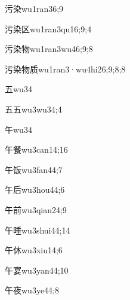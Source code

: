 \begin{verbete}{污染}{wu1ran3}{6;9}
\end{verbete}
\begin{verbete}{污染区}{wu1ran3qu1}{6;9;4}
\end{verbete}
\begin{verbete}{污染物}{wu1ran3wu4}{6;9;8}
\end{verbete}
\begin{verbete}{污染物质}{wu1ran3·wu4hi2}{6;9;8;8}
\end{verbete}
\begin{verbete}{五}{wu3}{4}
\end{verbete}
\begin{verbete}{五五}{wu3wu3}{4;4}
\end{verbete}
\begin{verbete}{午}{wu3}{4}
\end{verbete}
\begin{verbete}{午餐}{wu3can1}{4;16}
\end{verbete}
\begin{verbete}{午饭}{wu3fan4}{4;7}
\end{verbete}
\begin{verbete}{午后}{wu3hou4}{4;6}
\end{verbete}
\begin{verbete}{午前}{wu3qian2}{4;9}
\end{verbete}
\begin{verbete}{午睡}{wu3shui4}{4;14}
\end{verbete}
\begin{verbete}{午休}{wu3xiu1}{4;6}
\end{verbete}
\begin{verbete}{午宴}{wu3yan4}{4;10}
\end{verbete}
\begin{verbete}{午夜}{wu3ye4}{4;8}
\end{verbete}
